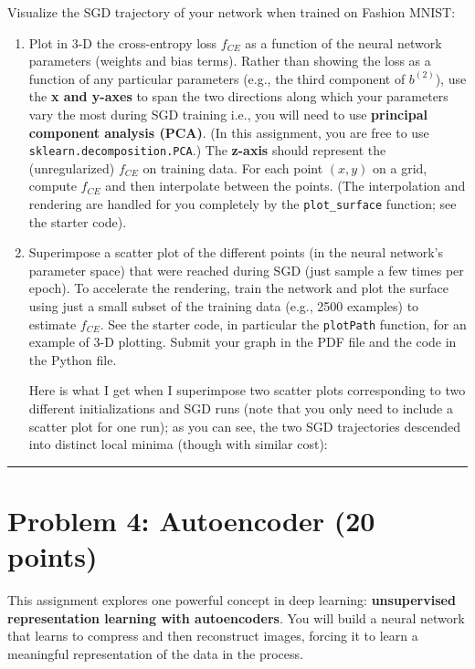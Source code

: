 \documentclass[
  letterpaper,
  DIV=11,
  numbers=noendperiod]{scrartcl}
\begin{document}
Visualize the SGD trajectory of your network when trained on Fashion
MNIST:

\begin{enumerate}
\def\labelenumi{\arabic{enumi}.}
\item
  Plot in 3-D the cross-entropy loss \(f_{CE}\) as a function of the
  neural network parameters (weights and bias terms). Rather than
  showing the loss as a function of any particular parameters (e.g., the
  third component of \(b^{(2)}\)), use the \textbf{x and y-axes} to span
  the two directions along which your parameters vary the most during
  SGD training i.e., you will need to use \textbf{principal component
  analysis (PCA)}. (In this assignment, you are free to use
  \texttt{sklearn.decomposition.PCA}.) The \textbf{z-axis} should
  represent the (unregularized) \(f_{CE}\) on training data. For each
  point \((x,y)\) on a grid, compute \(f_{CE}\) and then interpolate
  between the points. (The interpolation and rendering are handled for
  you completely by the \texttt{plot\_surface} function; see the starter
  code).
\item
  Superimpose a scatter plot of the different points (in the neural
  network's parameter space) that were reached during SGD (just sample a
  few times per epoch). To accelerate the rendering, train the network
  and plot the surface using just a small subset of the training data
  (e.g., 2500 examples) to estimate \(f_{CE}\). See the starter code, in
  particular the \texttt{plotPath} function, for an example of 3-D
  plotting. Submit your graph in the PDF file and the code in the Python
  file.

  Here is what I get when I superimpose two scatter plots corresponding
  to two different initializations and SGD runs (note that you only need
  to include a scatter plot for one run); as you can see, the two SGD
  trajectories descended into distinct local minima (though with similar
  cost):
\end{enumerate}

\begin{center}\rule{0.5\linewidth}{0.5pt}\end{center}

\section{Problem 4: Autoencoder (20
points)}\label{problem-4-autoencoder-20-points}

This assignment explores one powerful concept in deep learning:
\textbf{unsupervised representation learning with autoencoders}. You
will build a neural network that learns to compress and then reconstruct
images, forcing it to learn a meaningful representation of the data in
the process.
\end{document}
